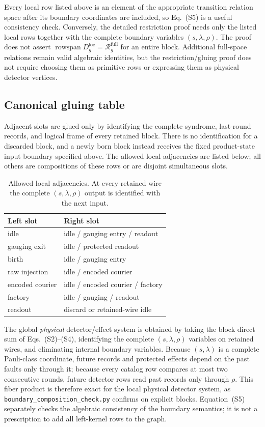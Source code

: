 \documentclass[aps,prx,reprint,superscriptaddress,nofootinbib,floatfix,longbibliography]{revtex4-2}
\theoremstyle{definition}
\begin{document}
Every local row listed above is an element of the appropriate transition
relation space after its boundary coordinates are included, so Eq.~(S5) is a
useful consistency check.  Conversely, the detailed restriction proof needs
only the listed local rows together with the complete boundary variables
$(s,\lambda,\rho)$.  The proof does not assert
$\operatorname{rowspan}D_g^{\mathrm{loc}}=\mathcal R_g^{\mathrm{full}}$ for an entire
block.  Additional full-space relations remain valid algebraic identities, but
the restriction/gluing proof does not require choosing them as primitive rows
or expressing them as physical detector vertices.

\subsection{Canonical gluing table}
Adjacent slots are glued only by identifying the complete syndrome, last-round
records, and logical frame of every retained block.  There is no identification for a discarded
block, and a newly born block instead receives the fixed product-state input
boundary specified above.  The allowed local adjacencies are listed below;
all others are compositions of these rows or are disjoint simultaneous slots.

\begin{table}[t]
\caption{Allowed local adjacencies.  At every retained wire the complete
$(s,\lambda,\rho)$ output is identified with the next input.}
\label{tab:gluing}
\centering
\begin{tabular}{l l}
\hline\hline
Left slot & Right slot \\
\hline
idle & idle / gauging entry / readout \\
gauging exit & idle / protected readout \\
birth & idle / gauging entry \\
raw injection & idle / encoded courier \\
encoded courier & idle / encoded courier / factory \\
factory & idle / gauging / readout \\
readout & discard or retained-wire idle \\
\hline\hline
\end{tabular}
\end{table}

The global \emph{physical} detector/effect system is obtained by taking the
block direct sum of Eqs.~(S2)--(S4), identifying the complete
$(s,\lambda,\rho)$ variables on retained wires, and eliminating internal
boundary variables.  Because $(s,\lambda)$ is a complete Pauli-class
coordinate, future records and protected effects depend on the past faults
only through it; because every catalog row compares at most two consecutive
rounds, future detector rows read past records only through $\rho$.  This
fiber product is therefore exact for the local physical detector system, as
\texttt{boundary\_composition\_check.py} confirms on explicit blocks.  Equation~(S5) separately checks the algebraic
consistency of the boundary semantics; it is not a prescription to add all
left-kernel rows to the graph.
\end{document}
